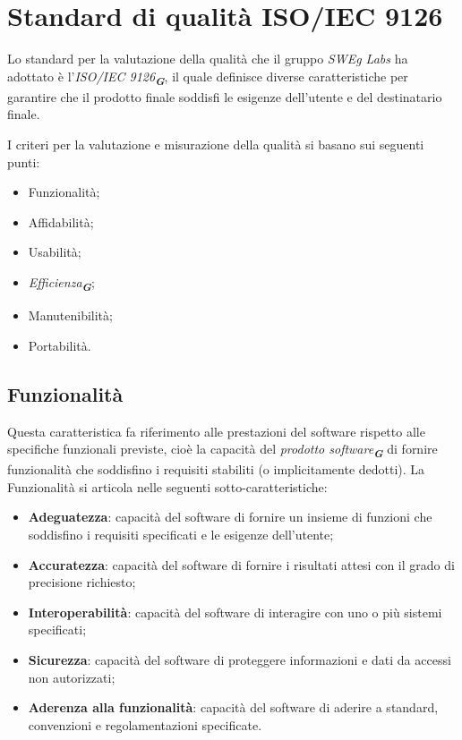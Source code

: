 


\section{Standard di qualità ISO/IEC 9126}
\label{sec:standard_qualità_iso-iec_9126}

Lo standard per la valutazione della qualità che il gruppo \emph{SWEg Labs} ha adottato è l’\emph{ISO/IEC 9126}\textsubscript{\textit{\textbf{G}}}, 
il quale definisce diverse caratteristiche per garantire che il prodotto finale soddisfi
le esigenze dell’utente e del destinatario finale.

I criteri per la valutazione e misurazione della qualità si basano sui seguenti punti:
\begin{itemize}
    \item Funzionalità;
    \item Affidabilità;
    \item Usabilità;
    \item \emph{Efficienza}\textsubscript{\textit{\textbf{G}}};
    \item Manutenibilità;
    \item Portabilità.
\end{itemize}


\subsection{Funzionalità}

Questa caratteristica fa riferimento alle prestazioni del software rispetto alle specifiche funzionali 
previste, cioè la capacità del \emph{prodotto software}\textsubscript{\textit{\textbf{G}}} di fornire funzionalità che soddisfino
i requisiti stabiliti (o implicitamente dedotti). La Funzionalità si articola nelle seguenti
sotto-caratteristiche:
\begin{itemize}
    \item \textbf{Adeguatezza}: capacità del software di fornire un insieme di funzioni che soddisfino i requisiti specificati e le esigenze dell’utente;
    \item \textbf{Accuratezza}: capacità del software di fornire i risultati attesi con il grado di precisione richiesto;
    \item \textbf{Interoperabilità}: capacità del software di interagire con uno o più sistemi specificati;
    \item \textbf{Sicurezza}: capacità del software di proteggere informazioni e dati da accessi non autorizzati;
    \item \textbf{Aderenza alla funzionalità}: capacità del software di aderire a standard, convenzioni e regolamentazioni specificate.
\end{itemize}


